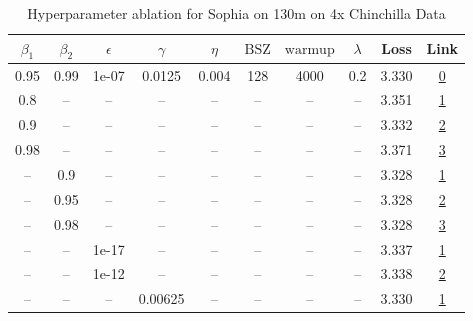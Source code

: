 \begin{table}[H]
\centering
\caption{Hyperparameter ablation for Sophia on 130m on 4x Chinchilla Data}
\label{tab:ablation_sophia_130m_on_4x_chinchilla_data}
\begin{tabular}{cccccccccc}
\toprule
$\beta_1$ & $\beta_2$ & $\epsilon$ & $\gamma$ & $\eta$ & $\mathrm{BSZ}$ & $\mathrm{warmup}$ & $\lambda$ & Loss & Link \\
\midrule
0.95 & 0.99 & 1e-07 & 0.0125 & 0.004 & 128 & 4000 & 0.2 & 3.330 & \href{https://wandb.ai/stanford-mercury/optimizer-scaling/runs/sweep-130m-10B-sophia420680lr0.004-wd0.2-minlr0-warmup4000-b10.9-95e0d1}{0} \\
\midrule
0.8 & -- & -- & -- & -- & -- & -- & -- & 3.351 & \href{https://wandb.ai/stanford-mercury/optimizer-scaling/runs/sweep-130m-10B-sophiam200bcelr0.004-wd0.2-minlr0-warmup4000-b10.-64829e}{1} \\
0.9 & -- & -- & -- & -- & -- & -- & -- & 3.332 & \href{https://wandb.ai/stanford-mercury/optimizer-scaling/runs/sweep-130m-10B-sophiamb9ea0dlr0.004-wd0.2-minlr0-warmup4000-b10.-05ae6d}{2} \\
0.98 & -- & -- & -- & -- & -- & -- & -- & 3.371 & \href{https://wandb.ai/stanford-mercury/optimizer-scaling/runs/sweep-130m-10B-sophiam2761c5lr0.004-wd0.2-minlr0-warmup4000-b10.-5683e6}{3} \\
-- & 0.9 & -- & -- & -- & -- & -- & -- & 3.328 & \href{https://wandb.ai/stanford-mercury/optimizer-scaling/runs/sweep-130m-10B-sophiamc45a60lr0.004-wd0.2-minlr0-warmup4000-b10.-c9c782}{1} \\
-- & 0.95 & -- & -- & -- & -- & -- & -- & 3.328 & \href{https://wandb.ai/stanford-mercury/optimizer-scaling/runs/sweep-130m-10B-sophiamba4c53lr0.004-wd0.2-minlr0-warmup4000-b10.-80e6d8}{2} \\
-- & 0.98 & -- & -- & -- & -- & -- & -- & 3.328 & \href{https://wandb.ai/stanford-mercury/optimizer-scaling/runs/sweep-130m-10B-sophiam0657f9lr0.004-wd0.2-minlr0-warmup4000-b10.-e83579}{3} \\
-- & -- & 1e-17 & -- & -- & -- & -- & -- & 3.337 & \href{https://wandb.ai/stanford-mercury/optimizer-scaling/runs/sweep-130m-10B-sophiam98a019lr0.004-wd0.2-minlr0-warmup4000-b10.-edcb0a}{1} \\
-- & -- & 1e-12 & -- & -- & -- & -- & -- & 3.338 & \href{https://wandb.ai/stanford-mercury/optimizer-scaling/runs/sweep-130m-10B-sophiame63af6lr0.004-wd0.2-minlr0-warmup4000-b10.-d35185}{2} \\
-- & -- & -- & 0.00625 & -- & -- & -- & -- & 3.330 & \href{https://wandb.ai/stanford-mercury/optimizer-scaling/runs/sweep-130m-10B-sophiamb10b9alr0.004-wd0.2-minlr0-warmup4000-b10.-4aa147}{1} \\

\end{tabular}
\end{table}
